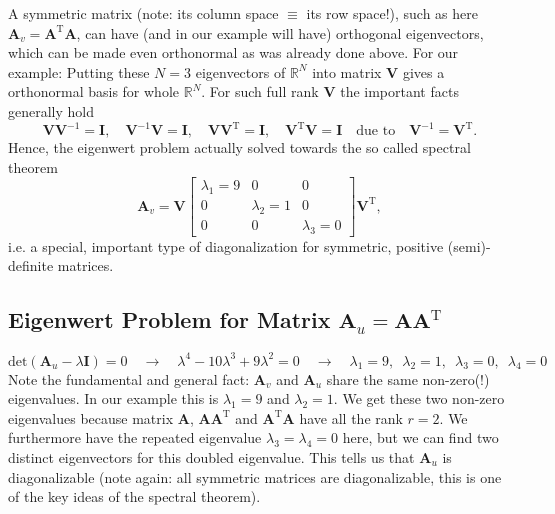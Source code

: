 \documentclass[a4paper, 11pt]{scrartcl}
\begin{document}
A symmetric matrix (note: its column space $\equiv$ its row space!), such as here $\bm{A}_v = \bm{A}^\mathrm{T} \bm{A}$, can have (and in our example will have) orthogonal eigenvectors, which can be made even orthonormal as was already done above. For our example: Putting these $N=3$ eigenvectors of $\mathbb{R}^N$ into matrix $\bm{V}$ gives a orthonormal basis for whole $\mathbb{R}^N$.
For such full rank $\bm{V}$ the important facts generally hold
$$\bm{V} \bm{V}^{-1} = \bm{I},\quad \bm{V}^{-1} \bm{V} = \bm{I}, \quad \bm{V} \bm{V}^\mathrm{T} = \bm{I}, \quad \bm{V}^\mathrm{T} \bm{V} = \bm{I} \quad \text{due to} \quad \bm{V}^{-1} = \bm{V}^\mathrm{T}.$$
Hence, the eigenwert problem actually solved towards the so called spectral theorem
$$
\bm{A}_v = \bm{V}
\begin{bmatrix}
\lambda_1=9 & 0 & 0\\
0 & \lambda_2=1 & 0\\
0 & 0 & \lambda_3=0
\end{bmatrix}
\bm{V}^\mathrm{T},
$$
i.e. a special, important type of diagonalization for symmetric, positive (semi)-definite matrices.

\subsection{Eigenwert Problem for Matrix $\bm{A}_u = \bm{A} \bm{A}^\mathrm{T}$}

$$
\mathrm{det}(\bm{A}_u - \lambda \bm{I}) = 0
\quad\rightarrow\quad
\lambda^4 - 10 \lambda^3 + 9 \lambda^2 = 0
\quad\rightarrow\quad
\lambda_1 = 9,\,\,\,
\lambda_2 = 1,\,\,\,
\lambda_3 = 0,\,\,\,
\lambda_4 = 0
$$
Note the fundamental and general fact: $\bm{A}_v$ and $\bm{A}_u$ share the same non-zero(!) eigenvalues.
In our example this is $\lambda_1=9$ and $\lambda_2=1$.
We get these two non-zero eigenvalues because matrix $\bm{A}$, $\bm{A} \bm{A}^\mathrm{T}$
and $\bm{A}^\mathrm{T} \bm{A}$ have all the rank $r=2$.
We furthermore have the repeated eigenvalue $\lambda_3 = \lambda_4 = 0$ here, but we can find two distinct eigenvectors for this doubled eigenvalue. This tells us that  $\bm{A}_u$ is diagonalizable (note again: all symmetric matrices are diagonalizable, this is one of the key ideas of the spectral theorem).
\end{document}
